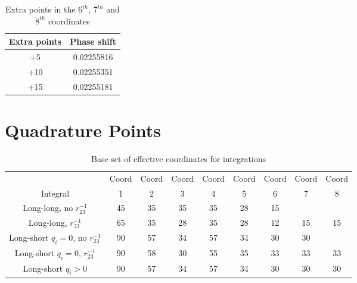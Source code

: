 \documentclass[Dissertation.tex]{subfiles}
\begin{document}
\begin{table}
\centering
\begin{tabular}{c c}
\toprule
Extra points & Phase shift \\
\midrule
+5 & 0.02255816 \\
+10 & 0.02255351 \\
+15 & 0.02255181 \\
\bottomrule
\end{tabular}
\caption{Extra points in the $6^{th}$, $7^{th}$ and $8^{th}$ coordinates}
\label{tab:678thcoordExtraPoints}
\end{table}



\section{Quadrature Points}
\label{sec:QuadraturePoints}


\begin{table}
\centering
\footnotesize
\begin{tabular}{c c c c c c c c c}
\toprule
 & Coord & Coord & Coord & Coord & Coord & Coord & Coord & Coord\\
Integral & 1 & 2 & 3 & 4 & 5 & 6 & 7 & 8 \\
\midrule
 Long-long, no $r_{23}^{-1}$ & 45 & 35 & 35 & 35 & 28 & 15 & & \\
 Long-long, $r_{23}^{-1}$ & 65 & 35 & 28 & 35 & 28 & 12 & 15 & 15 \\
\midrule
 Long-short $q_i = 0$, no $r_{23}^{-1}$ & 90 & 57 & 34 & 57 & 34 & 30 & 30 & \\
 Long-short $q_i = 0$, $r_{23}^{-1}$ & 90 & 58 & 30 & 55 & 35 & 33 & 33 & 33 \\
 Long-short $q_i > 0$ & 90 & 57 & 34 & 57 & 34 & 30 & 30 & 30 \\
\bottomrule
\end{tabular}
\caption{Base set of effective coordinates for integrations}
\label{tab:BaseEffectiveCoords}
\end{table}
\end{document}
